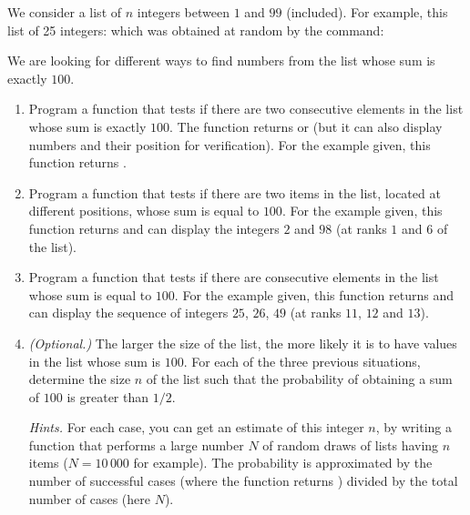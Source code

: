\documentclass[11pt,class=report,crop=false]{standalone}
\begin{document}
\begin{activite}


We consider a list of $n$ integers between $1$ and $99$ (included).
For example, this list of 25 integers:
\mycenterline{\ci{[16,2,85,27,9,45,98,73,12,26,46,25,26,49,18,99,10,86,7,42]}}
which was obtained at random by the command:

We are looking for different ways to find numbers from the list whose sum is exactly $100$.

\begin{enumerate}
  \item Program a  function that tests if there are two consecutive elements in the list whose sum is exactly $100$. The function returns  or  (but it can also display numbers and their position for verification). For the example given, this function returns .
  
  \item Program a  function that tests if there are two items in the list, located at different positions, whose sum is equal to $100$. 
 For the example given, this function returns  and can display the integers $2$ and $98$ (at ranks $1$ and $6$ of the list). 
 
 
  \item Program a  function that tests if there are consecutive elements in the list whose sum is equal to $100$. 
 For the example given, this function returns  and can display the sequence of integers $25$, $26$, $49$ (at ranks $11$, $12$ and $13$).
 
 \item \emph{(Optional.)} The larger the size of the list, the more likely it is to have values in the list whose sum is $100$. For each of the three previous situations, determine the size $n$ of the list such that the probability of obtaining a sum of $100$ is greater than $1/2$. 
 
  \emph{Hints.} For each case, you can get an estimate of this integer $n$, by writing a  function that performs a large number $N$ of random draws of lists having $n$ items ($N=10\,000$ for example). The probability is approximated by the number of successful cases (where the function returns ) divided by the total number of cases (here $N$).
 
 
  
\end{enumerate}

\end{activite}
\end{document}
